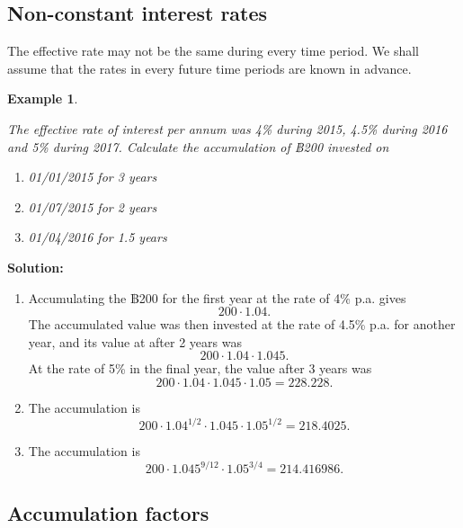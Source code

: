\documentclass[landscape, 20pt]{extreport}
\theoremstyle{definition}
\theoremstyle{definition}
\newtheorem{example}{Example}[chapter]
\theoremstyle{definition}
\theoremstyle{definition}
\theoremstyle{remark}
\begin{document}
\hypertarget{non-constant-interest-rates}{%
\newpage \subsection{Non-constant interest rates}\label{non-constant-interest-rates}}

The effective rate may not be the same during every time period. We
shall assume that the rates in every future time periods are known in
advance.

\newpage \begin{example}
\protect\hypertarget{exm:unlabeled-div-19}{}\label{exm:unlabeled-div-19}

\emph{The effective rate of interest per annum was 4\% during 2015, 4.5\%
during 2016 and 5\% during 2017. Calculate the accumulation of ฿200
invested on}

\begin{enumerate}
\def\labelenumi{\arabic{enumi}.}
\item
  \emph{01/01/2015 for 3 years}
\item
  \emph{01/07/2015 for 2 years}
\item
  \emph{01/04/2016 for 1.5 years}
\end{enumerate}

\end{example}

\textbf{Solution:}

\begin{enumerate}
\def\labelenumi{\arabic{enumi}.}
\item
  Accumulating the ฿200 for the first year at the rate of 4\% p.a.
  gives \[200 \cdot 1.04.\] The accumulated value was then invested at
  the rate of 4.5\% p.a. for another year, and its value at after 2
  years was \[200 \cdot 1.04 \cdot 1.045.\] At the rate of 5\% in the
  final year, the value after 3 years was
  \[200 \cdot 1.04 \cdot 1.045 \cdot 1.05 = 228.228.\]
\item
  The accumulation is
  \[200 \cdot 1.04^{1/2} \cdot 1.045 \cdot 1.05^{1/2} = 218.4025.\]
\item
  The accumulation is
  \[200 \cdot 1.045^{9/12} \cdot 1.05^{3/4} = 214.416986.\]
\end{enumerate}

\hypertarget{accumulation-factors}{%
\newpage \subsection{Accumulation factors}\label{accumulation-factors}}
\end{document}
